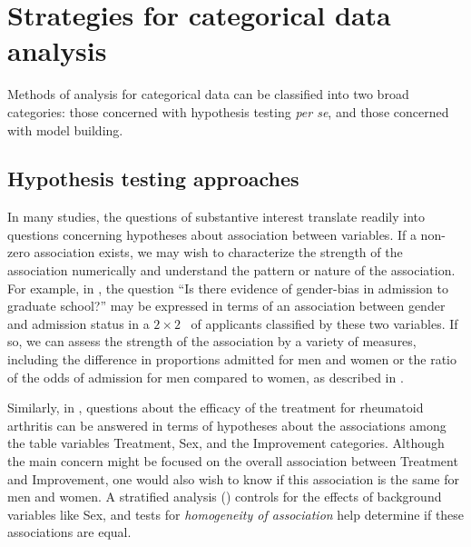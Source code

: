 \section{Strategies for categorical data analysis}\label{sec:intro-strat}
Methods of analysis for categorical data can be classified into two
broad categories:
those concerned with hypothesis testing \emph{per se}, and those concerned
with model building.

\subsection{Hypothesis testing approaches}
In many studies, the questions of substantive interest translate readily
into questions concerning hypotheses about association between variables.
If a non-zero association exists, we may wish to characterize the
strength of the association numerically and understand the pattern or
nature of the association.
For example, in , the question
``Is there evidence of gender-bias in admission to graduate school?''
may be expressed in terms of an association between gender and
admission status in a $2 \times 2$ \ctab\
of applicants classified by these two variables.
If so, we can assess the strength of the association by a variety of
measures, including the difference in proportions admitted for men
and women or the ratio of the odds of admission for men compared to
women, as described in \secref{sec:twoway-twobytwo}.

Similarly, in , questions about the efficacy of the
treatment for rheumatoid arthritis can be answered in terms of
hypotheses about the associations among the table variables
Treatment, Sex, and the Improvement categories.
Although the main concern might be focused on the overall association between
Treatment and Improvement, one would also wish to know if this association
is the same for men and women.  A stratified analysis () controls for the effects of background
variables like Sex, and tests for \emph{homogeneity of association}
help determine if these associations are equal.

